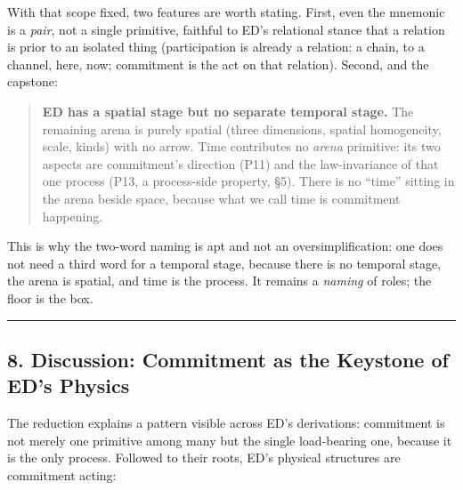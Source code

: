 \documentclass[
  11pt,
]{article}
\begin{document}
With that scope fixed, two features are worth stating. First, even the
mnemonic is a \emph{pair}, not a single primitive, faithful to ED's
relational stance that a relation is prior to an isolated thing
(participation is already a relation: a chain, to a channel, here, now;
commitment is the act on that relation). Second, and the capstone:

\begin{quote}
\textbf{ED has a spatial stage but no separate temporal stage.} The
remaining arena is purely spatial (three dimensions, spatial
homogeneity, scale, kinds) with no arrow. Time contributes no
\emph{arena} primitive: its two aspects are commitment's direction (P11)
and the law-invariance of that one process (P13, a process-side
property, §5). There is no ``time'' sitting in the arena beside space,
because what we call time is commitment happening.
\end{quote}

This is why the two-word naming is apt and not an oversimplification:
one does not need a third word for a temporal stage, because there is no
temporal stage, the arena is spatial, and time is the process. It
remains a \emph{naming} of roles; the floor is the box.

\begin{center}\rule{0.5\linewidth}{0.5pt}\end{center}

\subsection{8. Discussion: Commitment as the Keystone of ED's
Physics}\label{discussion-commitment-as-the-keystone-of-eds-physics}

The reduction explains a pattern visible across ED's derivations:
commitment is not merely one primitive among many but the single
load-bearing one, because it is the only process. Followed to their
roots, ED's physical structures are commitment acting:
\end{document}
